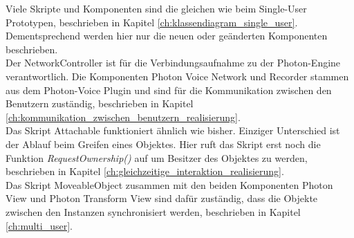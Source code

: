 Viele Skripte und Komponenten sind die gleichen wie beim Single-User Prototypen, beschrieben in Kapitel \ref{ch:klassendiagram_single_user}. Dementsprechend werden hier nur die neuen oder geänderten Komponenten beschrieben. \\
Der \grqq NetworkController\grqq{} ist für die Verbindungsaufnahme zu der Photon-Engine verantwortlich. Die Komponenten \grqq Photon Voice Network\grqq{} und \grqq Recorder\grqq{} stammen aus dem Photon-Voice Plugin und sind für die Kommunikation zwischen den Benutzern zuständig, beschrieben in Kapitel \ref{ch:kommunikation_zwischen_benutzern_realisierung}. \\
Das Skript \grqq Attachable\grqq{} funktioniert ähnlich wie bisher. Einziger Unterschied ist der Ablauf beim Greifen eines Objektes. Hier ruft das Skript erst noch die Funktion \textit{RequestOwnership()} auf um Besitzer des Objektes zu werden, beschrieben in Kapitel \ref{ch:gleichzeitige_interaktion_realisierung}. \\
Das Skript \grqq MoveableObject\grqq{} zusammen mit den beiden Komponenten \grqq Photon View\grqq{} und \grqq Photon Transform View\grqq{} sind dafür zuständig, dass die Objekte zwischen den Instanzen synchronisiert werden, beschrieben in Kapitel \ref{ch:multi_user}.